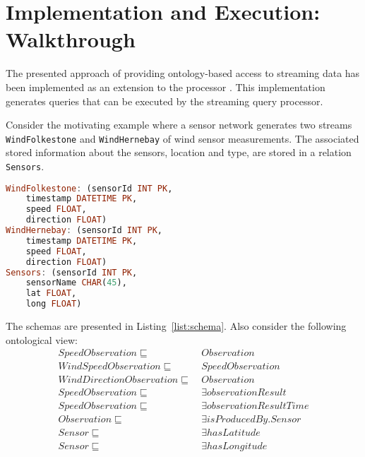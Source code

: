 \section{Implementation and Execution: Walkthrough}
\label{execution}

The presented approach of providing ontology-based access to streaming data has been implemented as an extension to the \odemapster processor \cite{Barrasa_04}. 
This implementation generates \sneeql queries that can be executed by the streaming query processor.


Consider the motivating example where a sensor network generates two streams \texttt{WindFolkestone} and \texttt{WindHernebay} of wind sensor measurements.
The associated stored information about the sensors, \eg location and type, are stored in a relation \texttt{Sensors}.

\begin{lstlisting}[style=SNEEqlStyle,language=Haskell,label=list:schema,caption=Relational schema of the stream data source.]
WindFolkestone: (sensorId INT PK, 
	timestamp DATETIME PK, 
	speed FLOAT, 
	direction FLOAT)
WindHernebay: (sensorId INT PK, 
	timestamp DATETIME PK, 
	speed FLOAT, 
	direction FLOAT)
Sensors: (sensorId INT PK, 
	sensorName CHAR(45), 
	lat FLOAT, 
	long FLOAT)
\end{lstlisting}

The schemas are presented in Listing~\ref{list:schema}. Also consider the following ontological view:
\vspace{-10pt}
\small
\begin{align*}%
SpeedObservation \sqsubseteq\ & Observation \\
WindSpeedObservation \sqsubseteq\ & SpeedObservation \\
WindDirectionObservation \sqsubseteq\ & Observation \\
SpeedObservation \sqsubseteq\ & \exists observationResult \\
SpeedObservation \sqsubseteq\ & \exists observationResultTime \\
Observation \sqsubseteq\ & \exists isProducedBy.Sensor \\
Sensor \sqsubseteq\ & \exists hasLatitude \\
Sensor \sqsubseteq\ & \exists hasLongitude \\
\end{align*}


